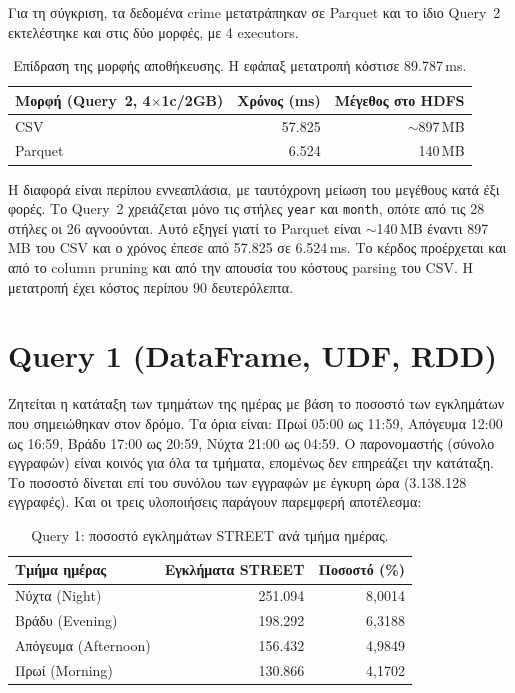 \documentclass[11pt]{article}
\newcommand{\code}[1]{\texttt{\small #1}}
\newcommand{\en}[1]{\textenglish{#1}}
\begin{document}
Για τη σύγκριση, τα δεδομένα \en{crime} μετατράπηκαν σε \en{Parquet} και το ίδιο
\en{Query}~2 εκτελέστηκε και στις δύο μορφές, με 4 \en{executors}.

\begin{table}[h]\centering
\begin{tabular}{lrr}
\toprule
Μορφή (\en{Query}~2, 4$\times$1\en{c}/2\en{GB}) & Χρόνος (ms) & Μέγεθος στο \en{HDFS} \\
\midrule
\en{CSV}     & 57.825 & $\sim$897\,MB \\
\en{Parquet} & 6.524  & 140\,MB \\
\bottomrule
\end{tabular}
\caption{Επίδραση της μορφής αποθήκευσης. Η εφάπαξ μετατροπή κόστισε 89.787\,ms.}
\label{tab:format}
\end{table}

Η διαφορά είναι περίπου εννεαπλάσια, με ταυτόχρονη μείωση του μεγέθους κατά έξι
φορές.
Το \en{Query}~2 χρειάζεται μόνο τις στήλες \code{year} και \code{month}, οπότε από
τις 28 στήλες οι 26 αγνοούνται. Αυτό εξηγεί γιατί το \en{Parquet} είναι
$\sim$140\,MB έναντι 897\,MB του \en{CSV} και ο χρόνος έπεσε από 57.825 σε
6.524\,ms. Το κέρδος προέρχεται και από το \en{column pruning} και από την απουσία
του κόστους \en{parsing} του \en{CSV}. Η μετατροπή έχει κόστος περίπου 90
δευτερόλεπτα.

\section{Query 1 (DataFrame, UDF, RDD)}

Ζητείται η κατάταξη των τμημάτων της ημέρας με βάση το ποσοστό των εγκλημάτων που
σημειώθηκαν στον δρόμο. Τα όρια είναι: Πρωί 05:00 ως 11:59,
Απόγευμα 12:00 ως 16:59, Βράδυ 17:00 ως 20:59, Νύχτα 21:00 ως 04:59. Ο παρονομαστής
(σύνολο εγγραφών) είναι κοινός για όλα τα τμήματα, επομένως δεν επηρεάζει την
κατάταξη. Το ποσοστό δίνεται επί του συνόλου των εγγραφών με έγκυρη ώρα
(3.138.128 εγγραφές). Και οι τρεις υλοποιήσεις παράγουν παρεμφερή αποτέλεσμα:

\begin{table}[h]\centering
\begin{tabular}{lrr}
\toprule
Τμήμα ημέρας & Εγκλήματα \en{STREET} & Ποσοστό (\%) \\
\midrule
Νύχτα (\en{Night})       & 251.094 & 8{,}0014 \\
Βράδυ (\en{Evening})     & 198.292 & 6{,}3188 \\
Απόγευμα (\en{Afternoon})& 156.432 & 4{,}9849 \\
Πρωί (\en{Morning})      & 130.866 & 4{,}1702 \\
\bottomrule
\end{tabular}
\caption{Query 1: ποσοστό εγκλημάτων \en{STREET} ανά τμήμα ημέρας.}
\end{table}
\end{document}
